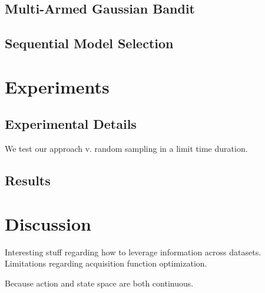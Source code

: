\documentclass{article}
\begin{document}
\subsection{Multi-Armed Gaussian Bandit}


\subsection{Sequential Model Selection}

\section{Experiments}
\subsection{Experimental Details}
We test our approach v. random sampling in a limit time duration.

\subsection{Results}

\section{Discussion}
Interesting stuff regarding how to leverage information across datasets. Limitations regarding acquisition function optimization. 

Because action and state space are both continuous. 


% 


\end{document}
